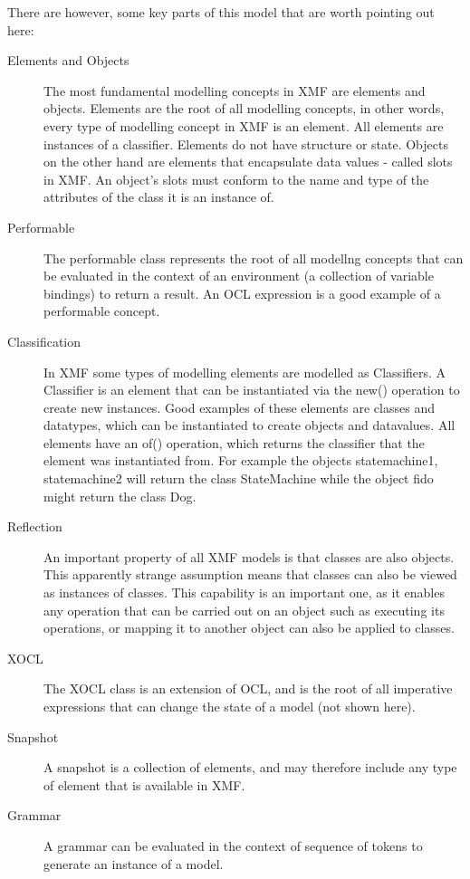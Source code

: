\noindent There are however, some key parts of this model that are
worth pointing out here:

\begin{description}
\item[Elements and Objects] The most fundamental modelling
concepts in XMF are elements and objects. Elements are the root of
all modelling concepts, in other words, every type of modelling
concept in XMF is an element. All elements are instances of a
classifier. Elements do not have structure or state. Objects on
the other hand are elements that encapsulate data values - called
slots in XMF. An object's slots must conform to the name and type
of the attributes of the class it is an instance of.
\item[Performable] The performable class represents the root of
all modellng concepts that can be evaluated in the context of an
environment (a collection of variable bindings) to return a
result. An OCL expression is a good example of a performable
concept. \item[Classification] In XMF some types of modelling
elements are modelled as Classifiers. A Classifier is an element
that can be instantiated via the new() operation to create new
instances. Good examples of these elements are classes and
datatypes, which can be instantiated to create objects and
datavalues. All elements have an of() operation, which returns the
classifier that the element was instantiated from. For example the
objects statemachine1, statemachine2 will return the class
StateMachine while the object fido might return the class Dog.
\item[Reflection] An important property of all XMF models is that
classes are also objects. This apparently strange assumption means
that classes can also be viewed as instances of classes. This
capability is an important one, as it enables any operation that
can be carried out on an object such as executing its operations,
or mapping it to another object can also be applied to classes.
\item[XOCL] The XOCL class is an extension of OCL, and is the root
of all imperative expressions that can change the state of a model
(not shown here). \item[Snapshot] A snapshot is a collection of
elements, and may therefore include any type of element that is
available in XMF. \item[Grammar] A grammar can be evaluated in the
context of sequence of tokens to generate an instance of a model.
\end{description}

